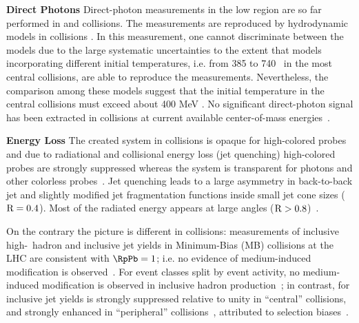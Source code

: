 \documentclass[../report.tex]{subfiles}
\begin{document}
\textbf{Direct Photons}
Direct-photon measurements in the low \pT region are so far performed in \PbPb and \pp collisions. The measurements are reproduced by hydrodynamic models in \PbPb collisions \cite{Adam:2015lda}. In this measurement, one cannot discriminate between the models due to the large systematic uncertainties to the extent that models incorporating different initial temperatures, i.e. from 385 to 740 \UMeV\ in the most central \PbPb collisions, are able to reproduce the measurements. Nevertheless, the comparison among these models suggest that the initial temperature in the central \PbPb collisions must exceed about 400 MeV \cite{Adam:2015lda}. No significant direct-photon signal has been extracted in \pp collisions at current available center-of-mass energies~\cite{Acharya:2018dqe}.

\textbf{Energy Loss}
The created system in \PbPb collisions is opaque for high-\pT colored probes and due to radiational and collisional energy loss (jet quenching) high-\pT colored probes are strongly suppressed whereas the system is transparent for photons and other colorless probes~\cite{Aamodt:2010jd,CMS:2012aa,Abelev:2012hxa,ALICE:2012ab,Aad:2014bxa,Adam:2015ewa,Aad:2015wga,Acharya:2018qsh,Acharya:2018njl}. Jet quenching leads to a large asymmetry in back-to-back jet \pT and slightly modified jet fragmentation functions inside small jet cone sizes ($\rm{R} = 0.4$). Most of the radiated energy appears at large angles ($\rm{R} > 0.8$)~\cite{Aad:2010bu,Chatrchyan:2011sx,Sirunyan:2018jju,Khachatryan:2016tfj,Sirunyan:2017bsd}. 

On the contrary the picture is different in \pPb collisions: measurements of inclusive high-\pT\ hadron and inclusive jet yields in Minimum-Bias (MB) \pPb collisions at the LHC are consistent with $\RpPb = 1$; i.e. no evidence of medium-induced modification is observed~\cite{Adam:2016jfp,Sirunyan:2016fcs}.
For event classes split by event activity, no medium-induced modification is observed in inclusive hadron production~\cite{Adam:2015doa, Acharya:2017okq}; in contrast, for inclusive jet yields \RpPb is strongly suppressed relative to unity in ``central'' \pPb collisions, and strongly enhanced in ``peripheral'' \pPb collisions~\cite{ATLAS:2014cpa}, attributed to selection biases~\cite{Acharya:2017okq}. 
\end{document}

